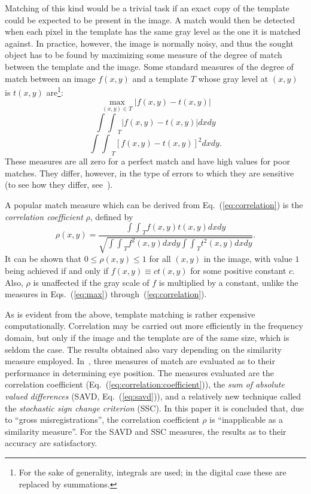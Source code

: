 Matching of this kind would be a trivial task if an exact copy of the
template could be expected to be present in the image.  A match would
then be detected when each pixel in the template has the same gray
level as the one it is matched against.  In practice, however, the
image is normally noisy, and thus the sought object has to be found by
maximizing some measure of the degree of match between the template
and the image.  Some standard measures of the degree of match between
an image $f(x,y)$ and a template $T$ whose gray level at $(x,y)$ is
$t(x,y)$ are\footnote{For the sake of generality, integrals are used;
  in the digital case these are replaced by summations.}:
\begin{equation}
\label{eq:max}
  \max_{(x,y)\in T}|f(x,y)-t(x,y)|
\end{equation}
\begin{equation}
\label{eq:savd}
  {\int\int}_{T}|f(x,y)-t(x,y)|dxdy
\end{equation}
\begin{equation}
\label{eq:correlation}
  {\int\int}_{T}[f(x,y)-t(x,y)]^{2}dxdy\mbox{.}
\end{equation}
These measures are all zero for a perfect match and have high values
for poor matches.  They differ, however, in the type of errors to
which they are sensitive (to see how they differ, see~\cite{digpat}).

A popular match measure which can be derived from
Eq.~(\ref{eq:correlation}) is the {\em correlation coefficient\/}
$\rho$, defined by
\begin{equation}
\label{eq:correlation:coefficient}
  \rho(x,y)=\frac{{\int\int}_{T}f(x,y)t(x,y)dxdy}
  {\sqrt{{\int\int}_{T}f^{2}(x,y)dxdy{\int\int}_{T}t^{2}(x,y)dxdy}}\mbox{.}
\end{equation}
It can be shown that $0\leq \rho(x,y)\leq 1$ for all $(x,y)$ in the
image, with value $1$ being achieved if and only if $f(x,y)\equiv
ct(x,y)$ for some positive constant $c$.  Also, $\rho$ is unaffected
if the gray scale of $f$ is multiplied by a constant, unlike the
measures in Eqs.~(\ref{eq:max}) through~(\ref{eq:correlation}).

As is evident from the above, template matching is rather expensive
computationally.  Correlation may be carried out more efficiently in
the frequency domain, but only if the image and the template are of
the same size, which is seldom the case.  The results obtained also
vary depending on the similarity measure employed.
In~\cite{template}, three measures of match are evaluated as to their
performance in determining eye position.  The measures evaluated are
the correlation coefficient (Eq.~(\ref{eq:correlation:coefficient})),
the {\em sum of absolute valued differences\/} (SAVD,
Eq.~(\ref{eq:savd})), and a relatively new technique called the {\em
  stochastic sign change criterion\/} (SSC).  In this paper it is
concluded that, due to ``gross misregistrations'', the correlation
coefficient $\rho$ is ``inapplicable as a similarity measure''.  For
the SAVD and SSC measures, the results as to their accuracy are
satisfactory.

